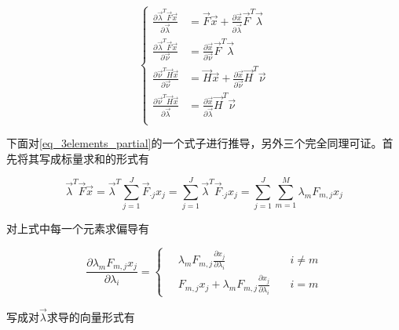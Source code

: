\begin{equation}\label{eq_3elements_partial}
    \left\{
    \begin{aligned}
        \frac{\partial \vec{\lambda}^T\vec{F}\vec{x}}{\partial \vec{\lambda}} & = \vec{F}\vec{x} + \frac{\partial \vec{x}}{\partial \vec{\lambda}}\vec{F}^T\vec{\lambda} \\
        \frac{\partial \vec{\lambda}^T\vec{F}\vec{x}}{\partial \vec{\nu}}     & = \frac{\partial \vec{x}}{\partial \vec{\nu}}\vec{F}^T\vec{\lambda}                      \\
        \frac{\partial \vec{\nu}^T\vec{H}\vec{x}}{\partial \vec{\nu}}         & = \vec{H}\vec{x} + \frac{\partial \vec{x}}{\partial \vec{\nu}}\vec{H}^T\vec{\nu}         \\
        \frac{\partial \vec{\nu}^T\vec{H}\vec{x}}{\partial \vec{\lambda}}     & = \frac{\partial \vec{x}}{\partial \vec{\lambda}}\vec{H}^T\vec{\nu}                      \\
    \end{aligned}
    \right.
\end{equation}

下面对\ref{eq_3elements_partial}的一个式子进行推导，另外三个完全同理可证。首先将其写成标量求和的形式有

\begin{equation}
    \vec{\lambda}^T\vec{F}\vec{x} =  \vec{\lambda}^T\sum_{j=1}^J\vec{F}_{\cdot j}x_j = \sum_{j=1}^J\vec{\lambda}^T\vec{F}_{\cdot j}x_j = \sum_{j=1}^J\sum_{m=1}^M\lambda_mF_{m,j}x_j
\end{equation}

对上式中每一个元素求偏导有

\begin{equation}
    \frac{\partial \lambda_mF_{m,j}x_j}{\partial\lambda_i} = \left\{
    \begin{aligned}
        \quad \lambda_mF_{m,j}\frac{\partial x_j}{\partial \lambda_i}              & \quad  i\neq m \\
        \quad F_{m,j}x_j + \lambda_mF_{m,j}\frac{\partial x_j}{\partial \lambda_i} & \quad i = m
    \end{aligned}
    \right.
\end{equation}

写成对$\vec{\lambda}$求导的向量形式有

